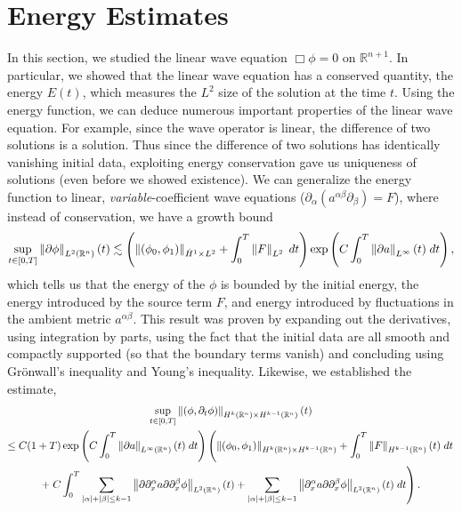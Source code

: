 \documentclass{article}
\begin{document}
	\section{Energy Estimates} 
	In this section, we studied the linear wave equation $\Box\phi = 0$ on $\mathbb{R}^{n + 1}$. In particular, we showed that the linear wave equation has a conserved quantity, the energy $E(t)$, which measures the $L^{2}$ size of the solution at the time $t$. Using the energy function, we can deduce numerous important properties of the linear wave equation. For example, since the wave operator is linear, the difference of two solutions is a solution. Thus since the difference of two solutions has identically vanishing initial data, exploiting energy conservation gave us uniqueness of solutions (even before we showed existence). We can generalize the energy function to linear, \textit{variable}-coefficient wave equations ($\partial_{\alpha}(a^{\alpha\beta}\partial_{\beta})= F$), where instead of conservation, we have a growth bound 
	\begin{equation*}
		\sup_{t \in [0,T]}\left\Vert \partial \phi \right\Vert_{L^{2}(\mathbb{R}^{n})}(t) \lesssim \left(\left\Vert (\phi_{0}, \phi_{1}) \right\Vert_{\dot{H}^{1} \times L^{2}} + \int_{0}^{T}\left\Vert F \right\Vert_{L^{2}}\;dt\right)\exp\left(C\int_{0}^{T}\left\Vert \partial a \right\Vert_{L^{\infty}}(t)\;dt\right), 
	\end{equation*} 
	which tells us that the energy of the $\phi$ is bounded by the initial energy, the energy introduced by the source term $F$, and energy introduced by fluctuations in the ambient metric $a^{\alpha\beta}$. This result was proven by expanding out the derivatives, using integration by parts, using the fact that the initial data are all smooth and compactly supported (so that the boundary terms vanish) and concluding using Gr\"onwall's inequality and Young's inequality. Likewise, we established the estimate, 
	\begin{multline*}
		\sup_{t\in[0,T]}\left\Vert (\phi, \partial_{t}\phi) \right\Vert_{H^{k}(\mathbb{R}^{n}) \times H^{k - 1}(\mathbb{R}^{n})}(t)\\ \leq C(1 + T)\exp\left(C\int_{0}^{T}\left\Vert \partial a \right\Vert_{L^{\infty}(\mathbb{R}^{n})}(t)\;dt\right)\left(\left\Vert (\phi_{0}, \phi_{1}) \right\Vert_{H^{k}(\mathbb{R}^{n}) \times H^{k - 1}(\mathbb{R}^{n})} + \int_{0}^{T}\left\Vert F \right\Vert_{H^{k - 1}(\mathbb{R}^{n})}(t)\;dt\right.\\ + \left. C\int_{0}^{T}\sum_{|\alpha| + |\beta| \leq k - 1}\left\Vert \partial\partial_{x}^{\alpha}a\partial\partial_{x}^{\beta}\phi \right\Vert_{L^{2}(\mathbb{R}^{n})}(t) + \sum_{|\alpha| + |\beta| \leq k- 1}\left\Vert \partial_{x}^{\alpha}a\partial\partial_{x}^{\beta}\phi \right\Vert_{L^{2}(\mathbb{R}^{n})}(t)\;dt\right). 
	\end{multline*}
\end{document}

